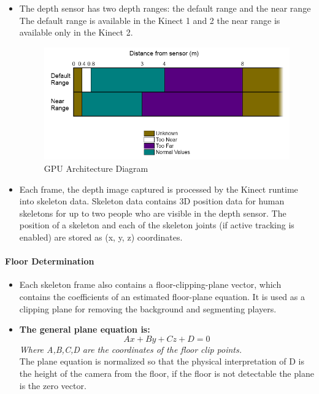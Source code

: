 \documentclass[a4paper,10pt]{article}
\begin{document}
\begin{itemize}
\item The depth sensor has two depth ranges: the default range and the near range The default range is available in the Kinect 1 and 2 the near range is available only in the Kinect 2.
\begin{figure}[H] %
	\includegraphics[width=\linewidth,height=\paperheight,keepaspectratio]{kinectRange.png}
	\caption{GPU Architecture Diagram}
	\label{fig:kinectRange}
	\end{figure}
\item Each frame, the depth image captured is processed by the Kinect runtime into skeleton data. Skeleton data contains 3D position data for human skeletons for up to two people who
are visible in the depth sensor. The position of a skeleton and each of the skeleton joints (if active tracking is enabled) are stored as (x, y, z) coordinates.

\end{itemize}
	
\paragraph{Floor Determination}
\begin{itemize}
 
\item Each skeleton frame also contains a floor-clipping-plane vector, which contains the coefficients of an estimated floor-plane equation. It is used as a clipping plane for
removing the background and segmenting players.
\item \textbf{The general plane equation is:}
\begin{equation}
  Ax + By + Cz + D = 0 
\end{equation}
 \textit{Where A,B,C,D are the coordinates of the floor clip points.}~\\
The plane equation is normalized so that the physical interpretation of D is the height of the camera from the floor, if the floor is not detectable 
the plane is the zero vector.

\end{itemize}
\end{document}
